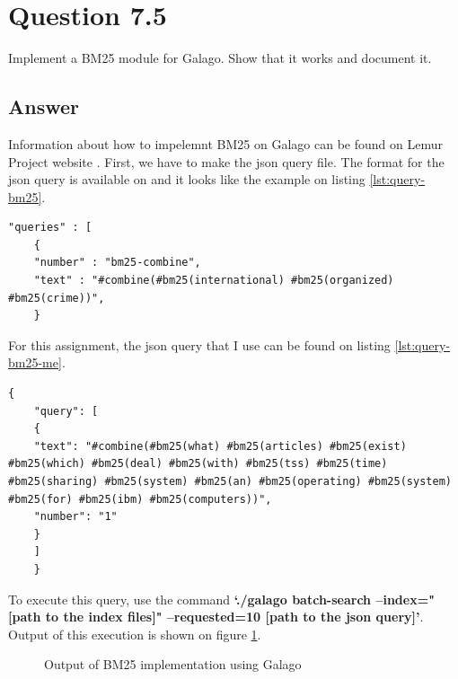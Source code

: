 \documentclass[letterpaper,11pt]{article}
\begin{document}
\noindent\makebox[\linewidth]{\rule{\textwidth}{0.4pt}}

\section*{Question 7.5}
\begin{spverbatim}
Implement a BM25 module for Galago. Show that it works and document it.
\end{spverbatim}

\subsection*{Answer}
Information about how to impelemnt BM25 on Galago can be found on Lemur Project website \cite{galago-operators}. First, we have to make the json query file. The format for the json query is available on \cite{galago-operators} and it looks like the example on listing \ref{lst:query-bm25}.

\begin{lstlisting}[caption={json query format for BM25}, label={lst:query-bm25}]
	"queries" : [
	{
	"number" : "bm25-combine",
	"text" : "#combine(#bm25(international) #bm25(organized) #bm25(crime))",
	}
\end{lstlisting}

For this assignment, the json query that I use can be found on listing \ref{lst:query-bm25-me}.
\begin{lstlisting}[caption={json query format for BM25}, label={lst:query-bm25-me}]
	{
	"query": [
	{
	"text": "#combine(#bm25(what) #bm25(articles) #bm25(exist) #bm25(which) #bm25(deal) #bm25(with) #bm25(tss) #bm25(time) #bm25(sharing) #bm25(system) #bm25(an) #bm25(operating) #bm25(system) #bm25(for) #bm25(ibm) #bm25(computers))", 
	"number": "1"
	}
	]
	}
\end{lstlisting}


To execute this query, use the command \textbf{`./galago batch-search --index="[path to the index files]" --requested=10 [path to the json query]'}. Output of this execution is shown on figure \ref{fig:7_5_galago_bm25_output}.

\begin{figure}[H]
	\centering
	\caption{Output of BM25 implementation using Galago}
	\label{fig:7_5_galago_bm25_output}
\end{figure}
\end{document}

